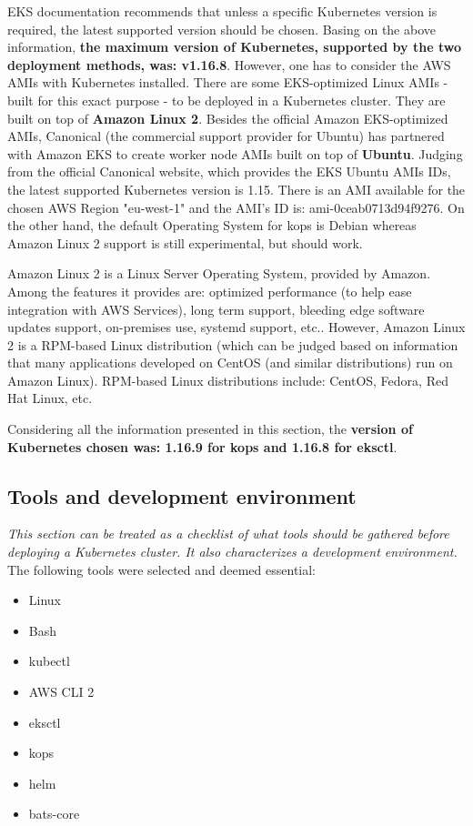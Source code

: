 EKS documentation recommends that unless a specific Kubernetes version is required, the latest supported version should be chosen\cite{online-eks-versions}. Basing on the above information, \textbf{the maximum version of Kubernetes, supported by the two deployment methods, was: v1.16.8}. However, one has to consider the AWS AMIs with Kubernetes installed. There are some EKS-optimized Linux AMIs - built for this exact purpose - to be deployed in a Kubernetes cluster. They are built on top of \textbf{Amazon Linux 2}\cite{eks-optimized-ami}. Besides the official Amazon EKS-optimized AMIs, Canonical (the commercial support provider for Ubuntu) has partnered with Amazon EKS to create worker node AMIs built on top of \textbf{Ubuntu}\cite{eks-ubu}. Judging from the official Canonical website, which provides the EKS Ubuntu AMIs IDs, the latest supported Kubernetes version is 1.15. There is an AMI available for the chosen AWS Region "eu-west-1" and the AMI's ID is: ami-0ceab0713d94f9276\cite{eks-ubu-ami-id}. On the other hand, the default Operating System for kops is Debian whereas Amazon Linux 2 support is still experimental, but should work\cite{online-kops-img}.

Amazon Linux 2 is a Linux Server Operating System, provided by Amazon. Among the features it provides are: optimized performance (to help ease integration with AWS Services), long term support, bleeding edge software updates support, on-premises use, systemd support, etc.\cite{al2}. However, Amazon Linux 2 is a RPM-based Linux distribution (which can be judged based on information that many applications developed on CentOS (and similar distributions) run on Amazon Linux)\cite{al2-centos}. RPM-based Linux distributions include: CentOS, Fedora, Red Hat Linux, etc.

Considering all the information presented in this section, the \textbf{version of Kubernetes chosen was: 1.16.9 for kops and 1.16.8 for eksctl}.


\subsection{Tools and development environment}
\label{tools}
\textit{This section can be treated as a checklist of what tools should be gathered before deploying a Kubernetes cluster. It also characterizes a development environment.}
\\

The following tools were selected and deemed essential:
\begin{itemize}
\item Linux
\item Bash
\item kubectl
\item AWS CLI 2
\item eksctl
\item kops
\item helm
\item bats-core
\end{itemize}

